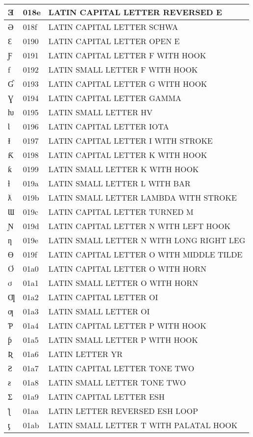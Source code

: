 \documentclass[12pt,letterpaper,openany]{book}
\begin{document}
\begin{center}
\begin{supertabular}{|m{0.25in}|m{0.5in}|m{4in}|}
Ǝ & 018e & LATIN CAPITAL LETTER REVERSED E\\\hline
Ə & 018f & LATIN CAPITAL LETTER SCHWA\\\hline
Ɛ & 0190 & LATIN CAPITAL LETTER OPEN E\\\hline
Ƒ & 0191 & LATIN CAPITAL LETTER F WITH HOOK\\\hline
ƒ & 0192 & LATIN SMALL LETTER F WITH HOOK\\\hline
Ɠ & 0193 & LATIN CAPITAL LETTER G WITH HOOK\\\hline
Ɣ & 0194 & LATIN CAPITAL LETTER GAMMA\\\hline
ƕ & 0195 & LATIN SMALL LETTER HV\\\hline
Ɩ & 0196 & LATIN CAPITAL LETTER IOTA\\\hline
Ɨ & 0197 & LATIN CAPITAL LETTER I WITH STROKE\\\hline
Ƙ & 0198 & LATIN CAPITAL LETTER K WITH HOOK\\\hline
ƙ & 0199 & LATIN SMALL LETTER K WITH HOOK\\\hline
ƚ & 019a & LATIN SMALL LETTER L WITH BAR\\\hline
ƛ & 019b & LATIN SMALL LETTER LAMBDA WITH STROKE\\\hline
Ɯ & 019c & LATIN CAPITAL LETTER TURNED M\\\hline
Ɲ & 019d & LATIN CAPITAL LETTER N WITH LEFT HOOK\\\hline
ƞ & 019e & LATIN SMALL LETTER N WITH LONG RIGHT LEG\\\hline
Ɵ & 019f & LATIN CAPITAL LETTER O WITH MIDDLE TILDE\\\hline
Ơ & 01a0 & LATIN CAPITAL LETTER O WITH HORN\\\hline
ơ & 01a1 & LATIN SMALL LETTER O WITH HORN\\\hline
Ƣ & 01a2 & LATIN CAPITAL LETTER OI\\\hline
ƣ & 01a3 & LATIN SMALL LETTER OI\\\hline
Ƥ & 01a4 & LATIN CAPITAL LETTER P WITH HOOK\\\hline
ƥ & 01a5 & LATIN SMALL LETTER P WITH HOOK\\\hline
Ʀ & 01a6 & LATIN LETTER YR\\\hline
Ƨ & 01a7 & LATIN CAPITAL LETTER TONE TWO\\\hline
ƨ & 01a8 & LATIN SMALL LETTER TONE TWO\\\hline
Ʃ & 01a9 & LATIN CAPITAL LETTER ESH\\\hline
ƪ & 01aa & LATIN LETTER REVERSED ESH LOOP\\\hline
ƫ & 01ab & LATIN SMALL LETTER T WITH PALATAL HOOK\\\hline

\end{supertabular}
\end{center}
\end{document}
